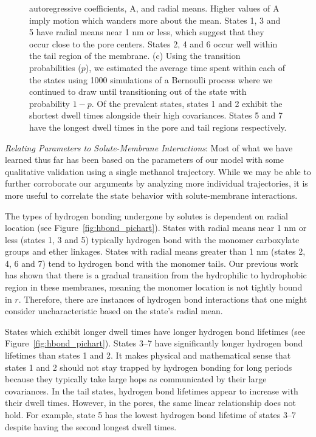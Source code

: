 \documentclass[journal=jpcbfk,manuscript=article]{achemso}
\begin{document}
\begin{figure}
{  autoregressive coefficients, A, and radial means. Higher values of A imply motion which wanders 
  more about the mean. States 1, 3 and 5 have radial means near 1 nm or less, which suggest that they
  occur close to the pore centers. States 2, 4 and 6 occur well within the tail region of the membrane.
  (c) Using the transition probabilities ($p$), we estimated the average time spent within each 
  of the states using 1000 simulations of a Bernoulli process where we continued to draw until transitioning
  out of the state with probability $1 - p$. Of the prevalent states, states 1 and 
  2 exhibit the shortest dwell times alongside their high covariances. States 5 and 7 have the longest dwell times in the pore and tail regions respectively.
  }\label{fig:common_states_MET}
  \end{figure}
  
  \textit{Relating Parameters to Solute-Membrane Interactions}: Most of what we 
  have learned thus far has been based on the parameters of our model with some 
  qualitative validation using a single methanol trajectory. While 
  we may be able to further corroborate our arguments by analyzing more
  individual trajectories, it is more useful to correlate the state behavior with
  solute-membrane interactions.

  The types of hydrogen bonding undergone by solutes is dependent on radial
  location (see Figure~\ref{fig:hbond_pichart}). States with radial means near 1 nm
  or less (states 1, 3 and 5) typically hydrogen bond with the monomer carboxylate
  groups and ether linkages. States with radial means greater than 1 nm (states 2,
  4, 6 and 7) tend to hydrogen bond with the monomer tails. Our previous work has
  shown that there is a gradual transition from the hydrophilic to hydrophobic region in
  these membranes, meaning the monomer location is not tightly bound in $r$. 
  Therefore, there are instances of hydrogen bond interactions that one might consider 
  uncharacteristic based on the state's radial mean.

  States which exhibit longer dwell times have longer hydrogen bond lifetimes (see
  Figure~\ref{fig:hbond_pichart}). States 3--7 have significantly longer hydrogen 
  bond lifetimes than states 1 and 2. It makes physical and mathematical sense that
  states 1 and 2 should not stay trapped by hydrogen bonding for long periods because
  they typically take large hops as communicated by their large covariances.
  In the tail states, hydrogen bond lifetimes appear to increase with their dwell 
  times. However, in the pores, the same linear relationship does not hold.
  For example, state 5 has the lowest hydrogen bond lifetime of states 3--7
  despite having the second longest dwell times. 
  
\end{document}
